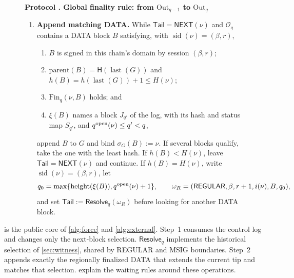 \documentclass[11pt,a4paper]{article}
\newcommand{\Hash}{\mathsf H}
\newcommand{\tagg}[1]{\ensuremath{\mathsf{#1}}}
\newcounter{protocol}
\newenvironment{protocol}[3][htbp]{\begin{figure}[#1]\refstepcounter{protocol}\label{#2}
\begin{mdframed}[linewidth=.6pt,skipabove=0pt,skipbelow=0pt,
innertopmargin=7pt,innerbottommargin=7pt]\small
\textbf{Protocol \theprotocol. #3}\par\smallskip}{\end{mdframed}\end{figure}}
\begin{document}
\begin{protocol}[H]{alg:global-rule}{Global finality rule: from $\mathrm{Out}_{q-1}$ to $\mathrm{Out}_q$}
\begin{enumerate}[label=\textbf{\arabic*)},itemsep=3pt]
\item \textbf{Append matching DATA.}
While $\mathsf{Tail}=\tagg{NEXT}(\nu)$ and $\mathcal O_q$ contains a
DATA block $B$ satisfying, with
$\operatorname{sid}(\nu)=(\beta,r)$,
  \begin{enumerate}[label=(\alph*),itemsep=1pt]
  \item $B$ is signed in this chain's domain by session $(\beta,r)$;
  \item $\mathrm{parent}(B)=\Hash(\operatorname{last}(G))$ and
  $h(B)=h(\operatorname{last}(G))+1\le H(\nu)$;
  \item $\mathrm{Fin}_q(\nu,B)$ holds; and
  \item $\xi(B)$ names a block $J_{q'}$ of the log, with its hash and
  status map $S_{q'}$, and $q^{\rm open}(\nu)\le q'<q$,
  \end{enumerate}
append $B$ to $G$ and bind $\sigma_G(B):=\nu$.  If several blocks
qualify, take the one with the least hash.  If $h(B)<H(\nu)$, leave
$\mathsf{Tail}=\tagg{NEXT}(\nu)$ and continue.  If $h(B)=H(\nu)$, write
$\operatorname{sid}(\nu)=(\beta,r)$, let
\[
 q_0=\max\{\operatorname{height}(\xi(B)),q^{\rm open}(\nu)+1\},
 \qquad
 \omega_R=(\tagg{REGULAR},\beta,r+1,i(\nu),B,q_0),
\]
and set $\mathsf{Tail}:=\tagg{Resolve}_q(\omega_R)$ before looking for
another DATA block.
\end{enumerate}
\end{protocol}

 is the public core of \cref{alg:force} and
\cref{alg:external}. Step~1 consumes the control log and changes only the
next-block selection.  $\tagg{Resolve}_q$ implements the historical
selection of \cref{sec:witness}, shared by REGULAR and MSIG boundaries.
Step~2 appends exactly the regionally finalized DATA that extends the
current tip and matches that selection. 
explain the waiting rules around these operations.
\end{document}
